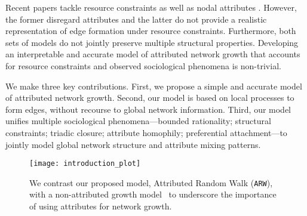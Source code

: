 Recent papers tackle resource constraints
\cite{mossa2002truncation,zeng2005construction,wang2009local} as well as nodal
attributes \cite{de2013scale,gong2012evolution}. However, the former disregard
attributes and the latter do not provide a realistic representation of edge
formation under resource constraints. Furthermore, both sets of models do not
jointly preserve multiple structural properties. Developing an interpretable and
accurate model of attributed network growth that accounts for resource constraints and observed sociological phenomena is non-trivial.

We make three key contributions.
First, we propose a simple and accurate model of attributed network growth.
Second, our model is based on local processes to form edges, without recourse to global network information.
Third, our model unifies multiple sociological phenomena---bounded rationality; structural constraints; triadic closure; attribute homophily; preferential attachment---to jointly  model global network structure and attribute mixing patterns.




\begin{figure}
	\centering
	\texttt{[image: introduction\_plot]}
    \caption{We contrast our proposed model, Attributed Random Walk (\texttt{ARW}), with a non-attributed growth model~\cite{holme2002growing} to underscore the importance of using attributes for network growth.}
	\label{fig:intro_plot}
  \vspace{-13pt}
\end{figure}




